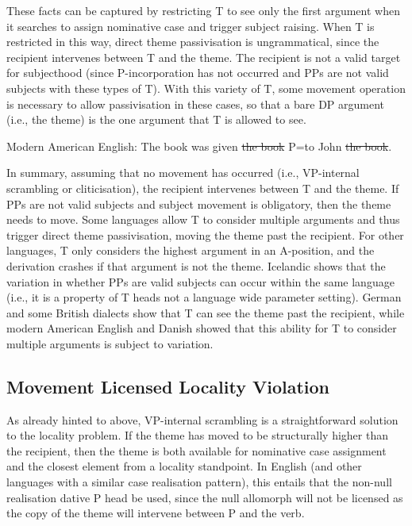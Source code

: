 These facts can be captured by restricting T to see only the first argument when it searches to assign nominative case and trigger subject raising. When T is restricted in this way, direct theme passivisation is ungrammatical, since the recipient intervenes between T and the theme. The recipient is not a valid target for subjecthood (since P-incorporation has not occurred and PPs are not valid subjects with these types of T). With this variety of T, some movement operation is necessary to allow passivisation in these cases, so that a bare DP argument (i.e., the theme) is the one argument that T is allowed to see.  
\begin{exe}
	\ex Modern American English: The book was given \sout{the book} P=to John \sout{the book}.\label{ex:amen-thepass}
\end{exe}

In summary, assuming that no movement has occurred (i.e., VP-internal scrambling or cliticisation), the recipient intervenes between T and the theme. If PPs are not valid subjects and subject movement is obligatory, then the theme needs to move. Some languages allow T to consider multiple arguments and thus trigger direct theme passivisation, moving the theme past the recipient. For other languages, T only considers the highest argument in an A-position, and the derivation crashes if that argument is not the theme. Icelandic shows that the variation in whether PPs are valid subjects can occur within the same language (i.e., it is a property of T heads not a language wide parameter setting). German and some British dialects show that T can see the theme past the recipient, while modern American English and Danish showed that this ability for T to consider multiple arguments is subject to variation.

\subsection{Movement Licensed Locality Violation}
As already hinted to above, VP-internal scrambling is a straightforward solution to the locality problem. If the theme has moved to be structurally higher than the recipient, then the theme is both available for nominative case assignment and the closest element from a locality standpoint. In English (and other languages with a similar case realisation pattern), this entails that the non-null realisation dative P head be used, since the null allomorph will not be licensed as the copy of the theme will intervene between P and the verb.

